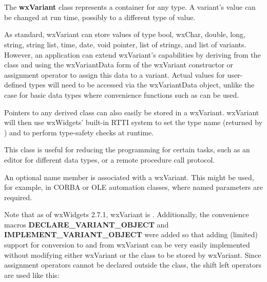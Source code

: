 
\section{}\label{wxvariant}

The {\bf wxVariant} class represents a container for any type.
A variant's value can be changed at run time, possibly to a different type of value.

As standard, wxVariant can store values of type bool, wxChar, double, long, string,
string list, time, date, void pointer, list of strings, and list of variants. 
However, an application can extend wxVariant's capabilities by deriving from the
class  and using the wxVariantData form of
the wxVariant constructor or assignment operator to assign this data to a variant.
Actual values for user-defined types will need to be accessed via the wxVariantData
object, unlike the case for basic data types where convenience functions such as
 can be used.

Pointers to any  derived class can also easily be stored
in a wxVariant. wxVariant will then use wxWidgets' built-in RTTI system to set the
type name (returned by ) and to perform 
type-safety checks at runtime.

This class is useful for reducing the programming for certain tasks, such as an editor
for different data types, or a remote procedure call protocol.

An optional name member is associated with a wxVariant. This might be used, for example,
in CORBA or OLE automation classes, where named parameters are required.

Note that as of wxWidgets 2.7.1, wxVariant is . 
Additionally, the convenience macros {\bf DECLARE\_VARIANT\_OBJECT} and 
{\bf IMPLEMENT\_VARIANT\_OBJECT} were added so that adding (limited) support 
for conversion to and from wxVariant can be very easily implemented without modifying 
either wxVariant or the class to be stored by wxVariant. Since assignment operators 
cannot be declared outside the class, the shift left operators are used like this:

